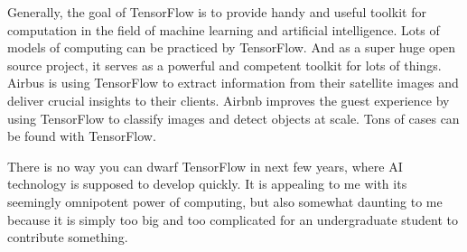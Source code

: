 \documentclass[11pt]{article}
\begin{document}
Generally, the goal of TensorFlow is to provide handy and useful toolkit for computation in the field of machine learning and artificial intelligence. Lots of models of computing can be practiced by TensorFlow. And as a super huge open source project, it serves as a powerful and competent toolkit for lots of things. Airbus is using TensorFlow to extract information from their satellite images and deliver crucial insights to their clients. Airbnb improves the guest experience by using TensorFlow to classify images and detect objects at scale. Tons of cases can be found with TensorFlow.

There is no way you can dwarf TensorFlow in next few years, where AI technology is supposed to develop quickly. It is appealing to me with its seemingly omnipotent power of computing, but also somewhat daunting to me because it is simply too big and too complicated for an undergraduate student to contribute something.
\end{document}

